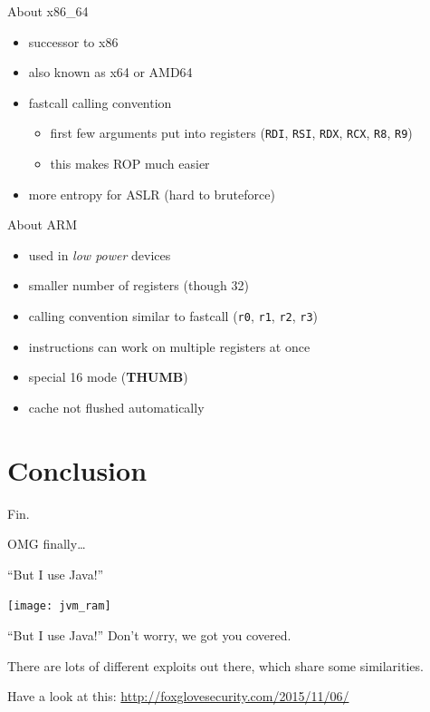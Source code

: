\documentclass[beamer]{uibk}
\begin{document}
\begin{frame}{About x86\_64}
    \begin{itemize}
        \item successor to x86
        \item also known as x64 or AMD64
        \item fastcall calling convention
            \begin{itemize}
                \item first few arguments put into registers (\texttt{RDI},
                    \texttt{RSI}, \texttt{RDX}, \texttt{RCX}, \texttt{R8},
                    \texttt{R9})
                \item this makes ROP much easier
            \end{itemize}
        \item more entropy for ASLR (hard to bruteforce)
    \end{itemize}
\end{frame}

\begin{frame}{About ARM}
    \begin{itemize}
        \item used in \emph{low power} devices
        \item smaller number of registers (though \SI{32}{\bit})
        \item calling convention similar to fastcall (\texttt{r0}, \texttt{r1},
            \texttt{r2}, \texttt{r3})
        \item instructions can work on multiple registers at once
        \item special \SI{16}{\bit} mode (\textbf{THUMB})
        \item cache not flushed automatically
    \end{itemize}
\end{frame}

\section*{Conclusion}

\begin{frame}{Fin.}
   \begin{center}
       \huge OMG finally\dots
   \end{center}
\end{frame}

\begin{frame}{``But I use Java!''}
    \begin{center}
        \texttt{[image: jvm\_ram]}
    \end{center}
\end{frame}

\begin{frame}{``But I use Java!''}
    Don't worry, we got you covered.
    \bigskip

    There are lots of different exploits out there, which share some
    similarities.
    \bigskip

    Have a look at this: \url{http://foxglovesecurity.com/2015/11/06/}
\end{frame}
\end{document}
